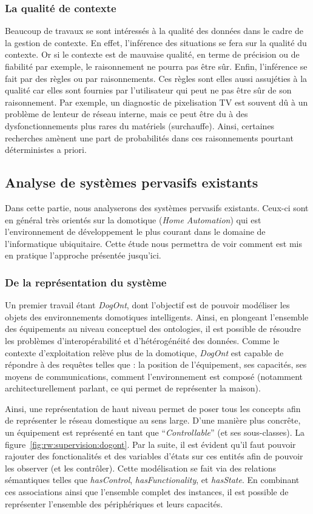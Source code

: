 \subsubsection{La qualité de contexte}
Beaucoup de travaux se sont intéressés à la qualité des données dans le cadre de la gestion de contexte. En effet, l'inférence des situations se fera sur la qualité du contexte. Or si le contexte est de mauvaise qualité, en terme de précision ou de fiabilité par exemple, le raisonnement ne pourra pas être sûr. Enfin, l'inférence se fait par des règles ou par raisonnements. Ces règles sont elles aussi assujéties à la qualité car elles sont fournies par l'utilisateur qui peut ne pas être sûr de son raisonnement. Par exemple, un diagnostic de pixelisation TV est souvent dû à un problème de lenteur de réseau interne, mais ce peut être du à des dysfonctionnements plus rares du matériels (surchauffe). Ainsi, certaines recherches amènent une part de probabilités dans ces raisonnements pourtant déterministes a priori.

\subsection{Analyse de systèmes pervasifs existants}
Dans cette partie, nous analyserons des systèmes pervasifs existants. Ceux-ci sont en général très orientés sur la domotique (\textit{Home Automation}) qui est l'environnement de développement le plus courant dans le domaine de l'informatique ubiquitaire. Cette étude nous permettra de voir comment est mis en pratique l'approche présentée jusqu'ici.

\subsubsection{De la représentation du système}
Un premier travail étant \textit{DogOnt}\cite{Bonino:dogont}, dont l'objectif est de pouvoir modéliser les objets des environnements domotiques intelligents. Ainsi, en plongeant l'ensemble des équipements au niveau conceptuel des ontologies, il est possible de résoudre les problèmes d'interopérabilité et d'hétérogénéité des données. Comme le contexte d'exploitation relève plus de la domotique, \textit{DogOnt} est capable de répondre à des requêtes telles que : la position de l'équipement, ses capacités, ses moyens de communications, comment l'environnement est composé (notamment architecturellement parlant, ce qui permet de représenter la maison).

Ainsi, une représentation de haut niveau permet de poser tous les concepts afin de représenter le réseau domestique au sens large. D'une manière plus concrête, un équipement est représenté en tant que \enquote{\it Controllable} (et ses sous-classes). La figure~\ref{fig:rw:supervision:dogont}. Par la suite, il est évident qu'il faut pouvoir rajouter des fonctionalités et des variables d'états sur ces entités afin de pouvoir les observer (et les contrôler). Cette modélisation se fait via des relations sémantiques telles que \textit{hasControl}, \textit{hasFunctionality}, et \textit{hasState}. En combinant ces associations ainsi que l'ensemble complet des instances, il est possible de représenter l'ensemble des périphériques et leurs capacités.

